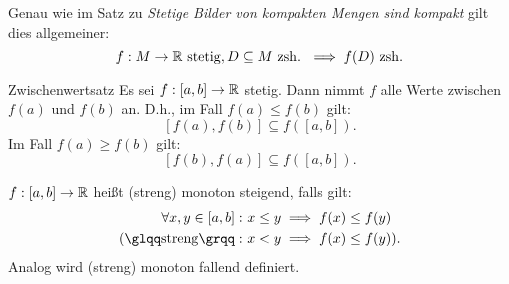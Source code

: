 \begin{bem}
    Genau wie im Satz zu \textit{Stetige Bilder von kompakten Mengen sind kompakt} gilt dies allgemeiner:
    \[
        f:M\to \mathbb{R} \mathrm{\ stetig}, D\subseteq M\mathrm{\ zsh.\ }\implies f(D) \mathrm{\ zsh}.
    \]
\end{bem}
\begin{kor}{Zwischenwertsatz}
    Es sei $f: [a,b]\to \mathbb{R}$ stetig. Dann nimmt $f$ alle Werte zwischen $f(a)$ und $f(b)$ an.
    D.h., im Fall $f(a)\leq f(b)$ gilt:
    \[
        [f(a),f(b)]\subseteq f([a,b]).
    \]
    Im Fall $f(a)\geq f(b)$ gilt:
    \[
        [f(b),f(a)]\subseteq f([a,b]).
    \]
\end{kor}
\begin{defn}
    $f:[a,b]\to\mathbb{R}$ heißt (streng) monoton steigend, falls gilt:
    \begin{align*}
        \forall x,y\in[a,b]:\ &x\leq y \implies f(x)\leq f(y)\\
        \mathrm{(\glqq streng\grqq}:\ &x<y\implies f(x) \leq f(y)\mathrm{)}.
    \end{align*}
    Analog wird (streng) monoton fallend definiert.
\end{defn}